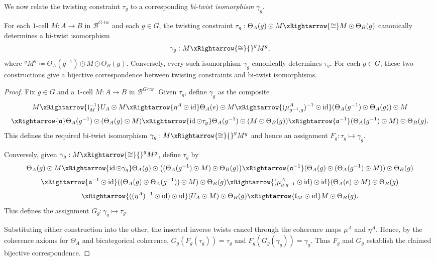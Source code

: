 \documentclass[11pt,oneside]{amsart}
\DeclareMathOperator{\id}{id}
\numberwithin{equation}{section}
\numberwithin{figure}{section}
\theoremstyle{plain}
\theoremstyle{definition}
\theoremstyle{remark}
\begin{document}
 

We now relate the twisting constraint \(\tau_{g}\) to a corresponding \emph{bi-twist isomorphism} \(\gamma_g\).

\begin{prop}\label{prop:gM-vs-gammaM}
For each $1$-cell $M:A\to B$ in $\mathcal B^{G\text{-tw}}$ and each $g\in G$, the twisting constraint
\(
\tau_g:\Theta_A(g)\odot M \xRightarrow{\cong} M\odot \Theta_B(g)
\)
canonically determines a bi-twist isomorphism
\begin{equation}\label{eq:gammaM}
\gamma_g: M \xRightarrow{\cong} {}^gM^g,
\end{equation}
where
\(
{}^gM^g \coloneqq \Theta_A(g^{-1})\odot M\odot \Theta_B(g).
\)
Conversely, every such isomorphism \(\gamma_g\) canonically determines
\(\tau_g\). For each \(g\in G\), these two constructions give a
bijective correspondence between twisting constraints and bi-twist
isomorphisms.
\end{prop}

\begin{proof}
Fix \(g\in G\) and a \(1\)-cell \(M:A\to B\) in
\(\mathcal B^{G\text{-tw}}\). Given \(\tau_g\), define \(\gamma_g\)
as the composite
\[
M \xRightarrow{\mathfrak l_M^{-1}} U_A\odot M
\xRightarrow{\eta^A\odot \id}
\Theta_A(e)\odot M
\xRightarrow{(\mu^A_{g^{-1},g})^{-1}\odot \id}
(\Theta_A(g^{-1})\odot \Theta_A(g))\odot M
\]
\[
\xRightarrow{\mathfrak a}
\Theta_A(g^{-1})\odot (\Theta_A(g)\odot M)
\xRightarrow{\id\odot \tau_{g}}
\Theta_A(g^{-1})\odot (M\odot \Theta_B(g))
\xRightarrow{\mathfrak a^{-1}}
(\Theta_A(g^{-1})\odot M)\odot \Theta_B(g).
\]
This defines the required bi-twist isomorphism
\(
\gamma_g:M\xRightarrow{\cong}{}^gM^g
\)
and hence an assignment \(F_g:\tau_g\mapsto\gamma_g\).

Conversely, given \(\gamma_g:M\xRightarrow{\cong}{}^gM^g\), define \(\tau_g\) by
\[
\Theta_A(g)\odot M
\xRightarrow{\id\odot \gamma_g}
\Theta_A(g)\odot\bigl((\Theta_A(g^{-1})\odot M)\odot \Theta_B(g)\bigr)
\xRightarrow{\mathfrak a^{-1}}
(\Theta_A(g)\odot(\Theta_A(g^{-1})\odot M))\odot \Theta_B(g)
\]
\[
\xRightarrow{\mathfrak a^{-1}\odot \id}
((\Theta_A(g)\odot\Theta_A(g^{-1}))\odot M)\odot \Theta_B(g)
\xRightarrow{(\mu^A_{g,g^{-1}}\odot \id)\odot \id}
(\Theta_A(e)\odot M)\odot \Theta_B(g)
\]
\[
\xRightarrow{((\eta^A)^{-1}\odot \id)\odot \id}
(U_A\odot M)\odot \Theta_B(g)
\xRightarrow{\mathfrak l_M\odot \id}
M\odot \Theta_B(g).
\]
This defines the assignment \(G_g:\gamma_g\mapsto\tau_g\).

Substituting either construction into the other, the inserted inverse
twists cancel through the coherence maps \(\mu^A\) and \(\eta^A\).
Hence, by the coherence axioms for \(\Theta_A\) and bicategorical
coherence,
\(
G_g(F_g(\tau_g))=\tau_g\) and \(F_g(G_g(\gamma_g))=\gamma_g.
\)
Thus \(F_g\) and \(G_g\) establish the claimed bijective correspondence.
\end{proof}
\end{document}
